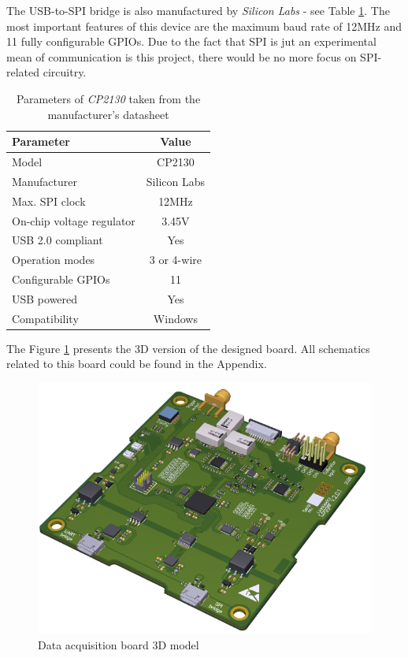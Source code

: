 \documentclass[12pt,a4paper]{article}
\begin{document}
The USB-to-SPI bridge is also manufactured by \textit{Silicon Labs} - see Table \ref{tab:cp2130_params}. The  most important features of this device are the maximum baud rate of 12MHz and 11 fully configurable GPIOs. Due to the fact that SPI is jut an experimental mean of communication is this project, there would be no more focus on SPI-related circuitry.

\begin{table}[ht!]
\begin{tabular}{|l|c|}
\hline
\textbf{Parameter}	& \textbf{Value} 	\\ \hline
Model  				& CP2130       \\ \hline
Manufacturer    	& Silicon Labs	\\ \hline
Max. SPI clock       	&  12MHz 		\\ \hline
On-chip voltage regulator     &  3.45V			\\ \hline
USB 2.0 compliant        &  Yes			\\ \hline
Operation modes        &  3 or 4-wire			\\ \hline
Configurable GPIOs 		&  11		\\ \hline
USB powered 	&  Yes 		\\ \hline
Compatibility 	&  Windows 		\\ \hline
\end{tabular}
\caption{Parameters of \textit{CP2130} taken from the manufacturer's datasheet \cite{cp2130_params}}
\label{tab:cp2130_params}
\end{table}

The Figure \ref{fig:logger3d} presents the 3D version of the designed board. All schematics related to this board could be found in the Appendix.

\begin{figure}[ht!]
\includegraphics[scale=0.9]{logger.png}
\caption{Data acquisition board 3D model}
\label{fig:logger3d}
\end{figure}
\end{document}
